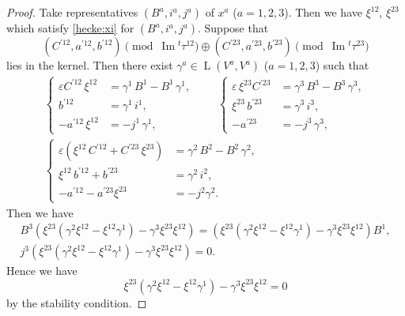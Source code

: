 \documentclass[12pt]{amsart}
\theoremstyle{definition}
\theoremstyle{remark}
\numberwithin{equation}{subsection}
\newcommand{\Ima}{\operatorname{Im}}
\newcommand{\HomL}{\operatorname{L}}
\begin{document}
\begin{proof}
Take representatives $(B^a , i^a , j^a )$ of $x^a$ ($a = 1,2,3$).
Then we have $\xi^{12}$, $\xi^{23}$ which satisfy \eqref{hecke:xi}
for $(B^a , i^a , j^a)$.
Suppose that
\begin{equation*}
(C^{\prime 12}, a^{\prime 12}, b^{\prime 12})\pmod{\Ima {}^t \tau^{12}}
\oplus
(C^{\prime 23}, a^{\prime 23}, b^{\prime 23})\pmod{\Ima {}^t \tau^{23}}
\end{equation*}
lies in the kernel.
Then there exist
$\gamma^a\in\HomL(V^a, V^a)$ ($a = 1,2,3$)
such that
\begin{equation}\label{eq:gamma}
\begin{gathered}
\left\{\begin{split}
        \varepsilon C^{\prime 12}\,\xi^{12}  &=
         \gamma^1\, B^1  - B^1 \, \gamma^1, \\
        b^{\prime 12} &= \gamma^1\, i^1,  \\
        -a^{\prime 12}\,\xi^{12}  &= - j^1 \,\gamma^1,
\end{split}\right.
\qquad
\left\{\begin{split}
        \varepsilon \,\xi^{23} C^{\prime 23}  &=
         \gamma^3\, B^3  - B^3 \, \gamma^3, \\
        \xi^{23}\,b^{\prime 23} &= \gamma^3\, i^3,  \\
        -a^{\prime 23} &= - j^3 \,\gamma^3,
\end{split}\right. \\
\left\{\begin{split}
                \varepsilon (\xi^{12} \, C^{\prime 12} +
                        C^{\prime 23} \, \xi^{23}) &=
                 \gamma^2\, B^2  - B^2 \, \gamma^2,\\
                \xi^{12} \, b^{\prime 12} + b^{\prime 23} &=
                 \gamma^2\,i^2,  \\
                -a^{\prime 12} - a^{\prime 23}\xi^{23} &= - j^2 \gamma^2.
\end{split}\right.
\end{gathered}
\end{equation}
Then we have
\begin{gather*}
  B^3\left(
    \xi^{23}(\gamma^2\xi^{12}-\xi^{12}\gamma^1)-\gamma^3\xi^{23}\xi^{12}
    \right)
    = \left(
    \xi^{23}(\gamma^2\xi^{12}-\xi^{12}\gamma^1)-\gamma^3\xi^{23}\xi^{12}
    \right) B^1, \\
  j^3\left(
    \xi^{23}(\gamma^2\xi^{12}-\xi^{12}\gamma^1)-\gamma^3\xi^{23}\xi^{12}
    \right) = 0.
\end{gather*}
Hence we have 
\begin{equation}
\label{eq:xigamma}
    \xi^{23}(\gamma^2\xi^{12}-\xi^{12}\gamma^1)-\gamma^3\xi^{23}\xi^{12}
     = 0
\end{equation}
by the stability condition.


\end{proof}
\end{document}
